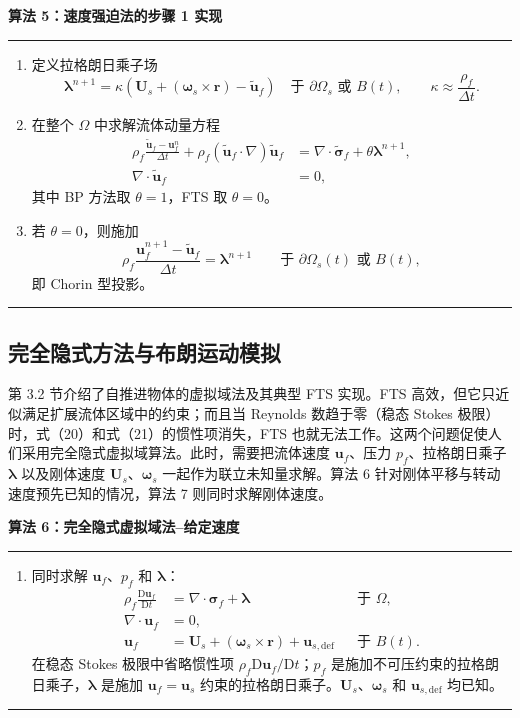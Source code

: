 \documentclass[UTF8,11pt,a4paper]{ctexart}
\newcommand{\D}{\mathrm{D}}
\newenvironment{algbox}[1]{%
  \par\medskip\noindent\textbf{#1}\par\smallskip\hrule\smallskip
  \begin{enumerate}[leftmargin=2.2em,label=\arabic*.]\small
}{%
  \end{enumerate}\smallskip\hrule\par\medskip
}
\begin{document}
\begin{algbox}{算法 5：速度强迫法的步骤 1 实现}
\item[(a)] 定义拉格朗日乘子场
\[
\bm\lambda^{n+1}=\kappa\left(\bm U_s+(\bm\omega_s\times\bm r)-\tilde{\bm u}_f\right)
\quad\text{于 }\partial\Omega_s\text{ 或 }B(t),
\qquad \kappa\approx\frac{\rho_f}{\Delta t}.
\]
\item[(b)] 在整个 $\Omega$ 中求解流体动量方程
\begin{align*}
\rho_f\frac{\tilde{\bm u}_f-\bm u_f^n}{\Delta t}
+\rho_f(\tilde{\bm u}_f\cdot\nabla)\tilde{\bm u}_f
&=\nabla\cdot\tilde{\bm\sigma}_f+\theta\bm\lambda^{n+1},\\
\nabla\cdot\tilde{\bm u}_f&=0,
\end{align*}
其中 BP 方法取 $\theta=1$，FTS 取 $\theta=0$。
\item[(c)] 若 $\theta=0$，则施加
\[
\rho_f\frac{\bm u_f^{n+1}-\tilde{\bm u}_f}{\Delta t}=\bm\lambda^{n+1}
\qquad\text{于 }\partial\Omega_s(t)\text{ 或 }B(t),
\]
即 Chorin 型投影。
\end{algbox}

\subsection{完全隐式方法与布朗运动模拟}

第 3.2 节介绍了自推进物体的虚拟域法及其典型 FTS 实现。FTS 高效，但它只近似满足扩展流体区域中的约束；而且当 Reynolds 数趋于零（稳态 Stokes 极限）时，式（20）和式（21）的惯性项消失，FTS 也就无法工作。这两个问题促使人们采用完全隐式虚拟域算法。此时，需要把流体速度 $\bm u_f$、压力 $p_f$、拉格朗日乘子 $\bm\lambda$ 以及刚体速度 $\bm U_s$、$\bm\omega_s$ 一起作为联立未知量求解。算法 6 针对刚体平移与转动速度预先已知的情况，算法 7 则同时求解刚体速度。

\begin{algbox}{算法 6：完全隐式虚拟域法--给定速度}
\item 同时求解 $\bm u_f$、$p_f$ 和 $\bm\lambda$：
\begin{align*}
\rho_f\frac{\D\bm u_f}{\D t}&=\nabla\cdot\bm\sigma_f+\bm\lambda &&\text{于 }\Omega,\\
\nabla\cdot\bm u_f&=0,\\
\bm u_f&=\bm U_s+(\bm\omega_s\times\bm r)+\bm u_{s,\mathrm{def}} &&\text{于 }B(t).
\end{align*}
在稳态 Stokes 极限中省略惯性项 $\rho_f\D\bm u_f/\D t$；$p_f$ 是施加不可压约束的拉格朗日乘子，$\bm\lambda$ 是施加 $\bm u_f=\bm u_s$ 约束的拉格朗日乘子。$\bm U_s$、$\bm\omega_s$ 和 $\bm u_{s,\mathrm{def}}$ 均已知。
\end{algbox}
\end{document}

